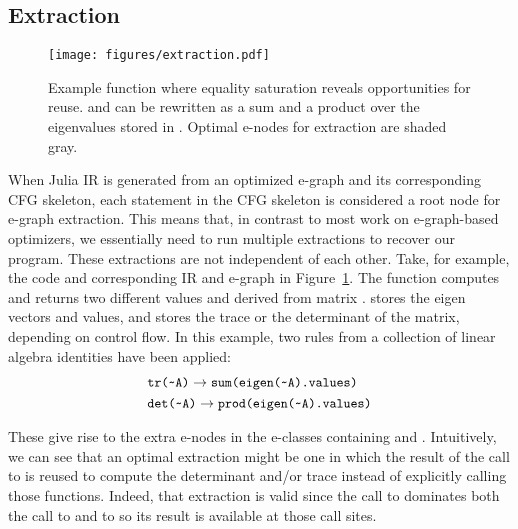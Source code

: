 \subsection{Extraction}
\label{sec:extraction}
\begin{figure}
    \centering
    \texttt{[image: figures/extraction.pdf]}
    \caption{Example function where equality saturation reveals opportunities for reuse.  and  can be rewritten as a sum and a product over the eigenvalues stored in . Optimal e-nodes for extraction are shaded gray.}
    \label{fig:extraction}
\end{figure}
When Julia IR is generated from an optimized e-graph and its corresponding CFG skeleton, each statement in the CFG skeleton is considered a root node for e-graph extraction. This means that, in contrast to most work on e-graph-based optimizers, we essentially need to run multiple extractions to recover our program.
These extractions are not independent of each other.
Take, for example, the code and corresponding IR and e-graph in Figure~\ref{fig:extraction}.
The function  computes and returns two different values  and  derived from matrix .  stores the eigen vectors and values, and  stores the trace or the determinant of the matrix, depending on control flow.
In this example, two rules from a collection of linear algebra identities have been applied:
{
\begin{align*}
& \code{tr(\char`\~A)} \rightarrow \code{sum(eigen(\char`\~A).values)}
\\
& \code{det(\char`\~A)} \rightarrow \code{prod(eigen(\char`\~A).values)}
\end{align*}
}

These give rise to the extra e-nodes in the e-classes containing  and .
Intuitively, we can see that an optimal extraction might be one in which the result of the call to  is reused to compute the determinant and/or trace instead of explicitly calling those functions.
Indeed, that extraction is valid since the call to  dominates both the call to  and to  so its result is available at those call sites.

